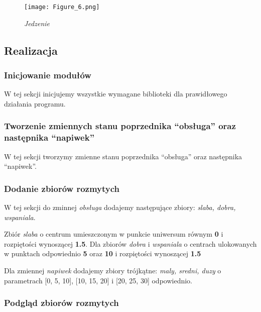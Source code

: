 \begin{figure}[H]
	\centering
	\texttt{[image: Figure\_6.png]}
	\caption{\textit{Jedzenie}}
	\label{fig:jedzenie}
\end{figure}

\subsection{Realizacja}\label{subsec:realizacja}
\subsubsection{Inicjowanie modułów}\label{ssc:inicjowanie}

W tej sekcji inicjujemy wszystkie wymagane biblioteki dla prawidłowego działania programu.



\subsubsection{Tworzenie zmiennych stanu poprzednika ``obsługa'' oraz następnika ``napiwek''}\label{ssc:tworzenie}

W tej sekcji tworzymy zmienne stanu poprzednika ``obsługa'' oraz następnika ``napiwek''.



\subsubsection{Dodanie zbiorów rozmytych}\label{ssc:dodanie_zbiorow_rozmytych}
 
W tej sekcji do zminnej \emph{obsługa} dodajemy następujące zbiory: \emph{slaba, dobra, wspaniala}. 

Zbiór \emph{slaba} o centrum umieszczonym w punkcie uniwersum równym \textbf{0} i rozpiętości wynoszącej \textbf{1.5}. Dla zbiorów \emph{dobra} i \emph{wspaniala} o centrach ulokowanych w punktach odpowiednio \textbf{5} oraz \textbf{10} i rozpiętości wynoszącej \textbf{1.5}

Dla zmiennej \emph{napiwek} dodajemy zbiory trójkątne: \emph{maly, sredni, duzy} o parametrach [0, 5, 10], [10, 15, 20] i [20, 25, 30] odpowiednio.



\subsubsection{Podgląd zbiorów rozmytych}\label{ssc:podglad_zbiorow}


